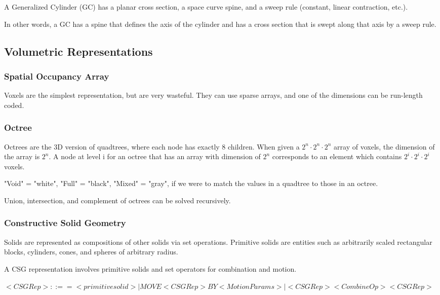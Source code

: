 \documentclass{article}
\begin{document}
\begin{multicols}{2}
A Generalized Cylinder (GC) has a planar cross section, a space curve spine, and a sweep rule (constant, linear contraction, etc.).

In other words, a GC has a spine that defines the axis of the cylinder and has a cross section that is swept along that axis by a sweep rule.

\subsection{Volumetric Representations}
\subsubsection{Spatial Occupancy Array}

Voxels are the simplest representation, but are very wasteful. They can use sparse arrays, and one of the dimensions can be run-length coded.

\subsubsection{Octree}

Octrees are the 3D version of quadtrees, where each node has exactly 8 children. When given a $2^n \cdot 2^n \cdot 2^n$ array of voxels, the dimension of the array is $2^n$. A node at level i for an octree that has an array with dimension of $2^n$ corresponds to an element which contains $2^i \cdot 2^i \cdot 2^i$ voxels.

"Void" = "white", "Full" = "black", "Mixed" = "gray", if we were to match the values in a quadtree to those in an octree.

Union, intersection, and complement of octrees can be solved recursively.

\subsubsection{Constructive Solid Geometry}

Solids are represented as compositions of other solids via set operations. Primitive solids are entities such as arbitrarily scaled rectangular blocks, cylinders, cones, and spheres of arbitrary radius.

A CSG representation involves primitive solids and set operators for combination and motion.

$<CSG Rep> ::== <primitive solid> | MOVE <CSG Rep> BY <Motion Params> | <CSG Rep> <Combine Op> <CSG Rep>$


\end{multicols}
\end{document}
